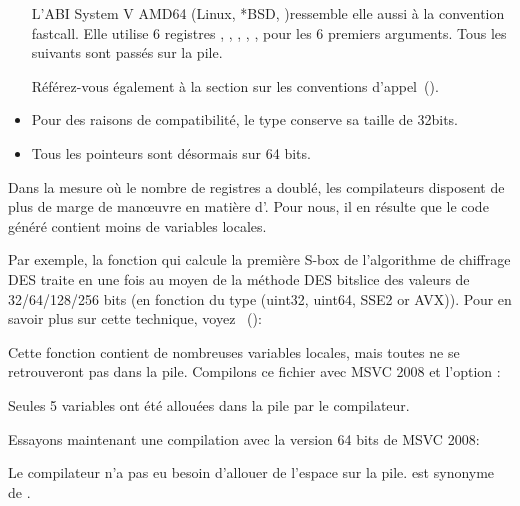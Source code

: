 \begin{itemize}
L'ABI System V AMD64 (Linux, *BSD, \MacOSX)\SysVABI ressemble elle aussi à la convention fastcall.
Elle utilise 6 registres \RDI, \RSI, \RDX, \RCX, ,  pour les 6 premiers arguments. 
Tous les suivants sont passés sur la pile.

Référez-vous également à la section sur les conventions d'appel~().

\item
Pour des raisons de compatibilité, le type \CCpp \Tint conserve sa taille de 32bits.

\item
Tous les pointeurs sont désormais sur 64 bits.

\end{itemize}


Dans la mesure où le nombre de registres a doublé, les compilateurs disposent de plus de marge 
de man\oe{}uvre en matière d'. 
Pour nous, il en résulte que le code généré contient moins de variables locales.


Par exemple, la fonction qui calcule la première S-box de l'algorithme de chiffrage DES traite 
en une fois au moyen de la méthode DES bitslice des valeurs de 32/64/128/256 bits (en fonction 
du type  (uint32, uint64, SSE2 or AVX)).
Pour en savoir plus sur cette technique, voyez ~():



Cette fonction contient de nombreuses variables locales, mais toutes ne se retrouveront pas dans 
la pile. Compilons ce fichier avec MSVC 2008 et l'option :



Seules 5 variables ont été allouées dans la pile par le compilateur.

Essayons maintenant une compilation avec la version 64 bits de MSVC 2008:



Le compilateur n'a pas eu besoin d'allouer de l'espace sur la pile.  est synonyme de .

\iffalse

